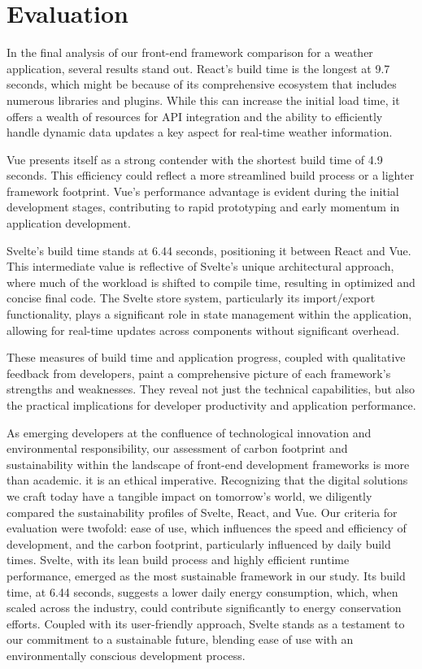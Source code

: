 \section{Evaluation}

In the final analysis of our front-end framework comparison for a weather application, several results stand out. React's build time is the longest at 9.7 seconds, which might be because of its comprehensive ecosystem that includes numerous libraries and plugins. While this can increase the initial load time, it offers a wealth of resources for API integration and the ability to efficiently handle dynamic data updates a key aspect for real-time weather information.

Vue presents itself as a strong contender with the shortest build time of 4.9 seconds. This efficiency could reflect a more streamlined build process or a lighter framework footprint. Vue's performance advantage is evident during the initial development stages, contributing to rapid prototyping and early momentum in application development.

Svelte's build time stands at 6.44 seconds, positioning it between React and Vue. This intermediate value is reflective of Svelte's unique architectural approach, where much of the workload is shifted to compile time, resulting in optimized and concise final code. The Svelte store system, particularly its import/export functionality, plays a significant role in state management within the application, allowing for real-time updates across components without significant overhead.

These measures of build time and application progress, coupled with qualitative feedback from developers, paint a comprehensive picture of each framework's strengths and weaknesses. They reveal not just the technical capabilities, but also the practical implications for developer productivity and application performance.

As emerging developers at the confluence of technological innovation and environmental responsibility, our assessment of carbon footprint and sustainability within the landscape of front-end development frameworks is more than academic. it is an ethical imperative. Recognizing that the digital solutions we craft today have a tangible impact on tomorrow's world, we diligently compared the sustainability profiles of Svelte, React, and Vue. Our criteria for evaluation were twofold: ease of use, which influences the speed and efficiency of development, and the carbon footprint, particularly influenced by daily build times. Svelte, with its lean build process and highly efficient runtime performance, emerged as the most sustainable framework in our study. Its build time, at 6.44 seconds, suggests a lower daily energy consumption, which, when scaled across the industry, could contribute significantly to energy conservation efforts. Coupled with its user-friendly approach, Svelte stands as a testament to our commitment to a sustainable future, blending ease of use with an environmentally conscious development process.

